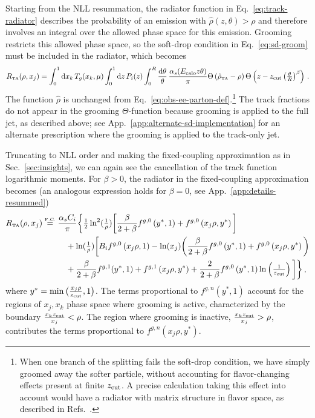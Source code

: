 \documentclass[letterpaper,11pt]{article}
\newcommand{\Refs}[1]{Refs.~\cite{#1}}
\newcommand{\Sec}[1]{Sec.~\ref{#1}}
\newcommand{\App}[1]{App.~\ref{#1}}
\newcommand{\Eq}[1]{Eq.~\eqref{#1}}
\begin{document}
Starting from the NLL resummation, the radiator function in \Eq{eq:track-radiator} describes the probability of an emission with $\hat{\rho}(z,\theta) > \rho$ and therefore involves an integral over the allowed phase space for this emission. 
%
Grooming restricts this allowed phase space, so the soft-drop condition in \Eq{eq:sd-groom} must be included in the radiator, which becomes
\begin{equation}
\label{eq:sd-radiator}
R_{\mbox{\tiny TA}}(\rho,x_j) = \int_0^1 \text{d}x_k\, T_g(x_k,\mu) \int_0^1 \text{d}z\, P_i(z)\int_0^R \frac{\text{d}\theta}{\theta}\, \frac{\alpha_s(E_{\rm calo}z\theta)}{\pi} \Theta\left(\hat{\rho}_{\mbox{\tiny TA}}-\rho\right) \Theta\left( z-z_{\rm cut} \left(\tfrac{\theta}{R}\right)^\beta \right)\, .
\end{equation}
The function $\hat{\rho}$ is unchanged from \Eq{eq:obs-ee-parton-def}.\footnote{When one branch of the splitting fails the soft-drop condition, we have simply groomed away the softer particle, without accounting for flavor-changing effects present at finite $z_{\rm cut}$.  A precise calculation taking this effect into account would have a radiator with matrix structure in flavor space, as described in \Refs{Dasgupta:2013ihk,Marzani:2017mva}. 
}
%
The track fractions do not appear in the grooming $\Theta$-function because grooming is applied to the full jet, as described above; see \App{app:alternate-sd-implementation} for an alternate prescription where the grooming is applied to the track-only jet.

Truncating to NLL order and making the fixed-coupling approximation as in \Sec{sec:insights}, we can again see the cancellation of the track function logarithmic moments. 
%
For $\beta > 0$, the radiator in the fixed-coupling approximation becomes (an analogous expression holds for $\beta = 0$, see \App{app:details-resummed})
\begin{align}
\label{eq:sd-radiator-nll}
R_{\mbox{\tiny TA}}(\rho,x_j) &\overset{\mbox{\tiny F.C.}}{=} \frac{\alpha_sC_i}{\pi} \bigg\{ \tfrac{1}{2}\ln^2(\tfrac{1}{\rho})\bigg[\frac{\beta}{2+\beta} f^{g,0}\left(y^*,1\right) + f^{g,0}\left(x_j\rho,y^*\right)\bigg]\\ \nonumber
%
&\hspace{1cm} + \ln(\tfrac{1}{\rho})\bigg[B_i f^{g,0}\left(x_j\rho,1\right) -\ln(x_j)\bigg( \frac{\beta}{2+\beta} f^{g,0}\left(y^*,1\right)+ f^{g,0}\left(x_j\rho,y^*\right)   \bigg) \\ \nonumber
%
&\hspace{1cm} +\frac{\beta}{2+\beta}f^{g,1}(y^*,1) + f^{g,1}\left(x_j\rho,y^*\right)   + \frac{2}{2+\beta} f^{g,0}\left(y^*,1\right) \ln\left(\tfrac{1}{z_{\rm cut}}\right)  \bigg]\bigg\}\,,
\end{align}
where $y^* = \min\big(\frac{x_j\rho}{z_{\rm cut}},1\big)$. 
%
The terms proportional to $f^{g,n}(y^*,1)$ account for the regions of $x_j,x_k$ phase space where grooming is active, characterized by the boundary $\frac{x_kz_{\rm cut}}{x_j} < \rho$. 
%
The region where grooming is inactive, $\frac{x_kz_{\rm cut}}{x_j} > \rho$, contributes the terms proportional to $f^{g,n}(x_j\rho,y^*)$. 
\end{document}
